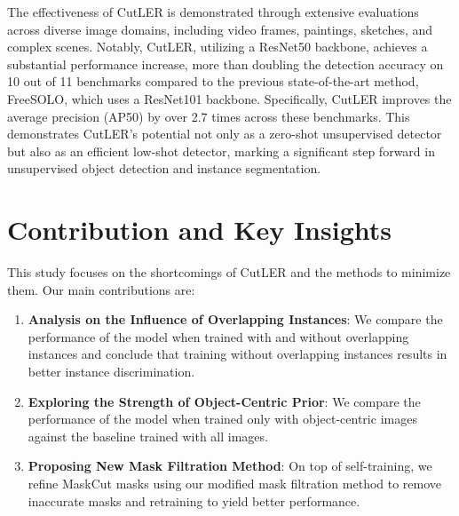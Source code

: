The effectiveness of CutLER is demonstrated through extensive evaluations across diverse image domains, including video frames, paintings, sketches, and complex scenes. Notably, CutLER, utilizing a ResNet50 backbone, achieves a substantial performance increase, more than doubling the detection accuracy on 10 out of 11 benchmarks compared to the previous state-of-the-art method, FreeSOLO, which uses a ResNet101 backbone. Specifically, CutLER improves the average precision (AP50) by over 2.7 times across these benchmarks. This demonstrates CutLER's potential not only as a zero-shot unsupervised detector but also as an efficient low-shot detector, marking a significant step forward in unsupervised object detection and instance segmentation.

\section{Contribution and Key Insights}

This study focuses on the shortcomings of CutLER and the methods to minimize them. Our main contributions are:

\begin{enumerate}
    
    \item \textbf{Analysis on the Influence of Overlapping Instances}: We compare the performance of the model when trained with and without overlapping instances and conclude that training without overlapping instances results in better instance discrimination.
    
    \item \textbf{Exploring the Strength of Object-Centric Prior}: We compare the performance of the model when trained only with object-centric images against the baseline trained with all images.

    \item \textbf{Proposing New Mask Filtration Method}: On top of self-training, we refine MaskCut masks using our modified mask filtration method to remove inaccurate masks and retraining to yield better performance.
\end{enumerate}


